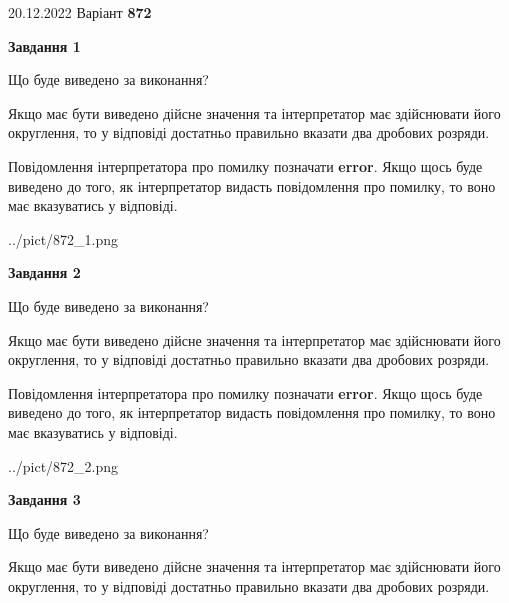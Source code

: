\documentclass[12pt, ukrainian]{article}
\begin{document}
{20.12.2022 Варіант \No \textbf { 872 }\par}
{
\begin {Large}

{\begin {center}\textbf{Завдання 1}\end {center}}\par
Що буде виведено за виконання? \par

Якщо має бути виведено дійсне значення та інтерпретатор має здійснювати його округлення, 
то у відповіді достатньо правильно вказати два дробових розряди.

Повідомлення інтерпретатора про помилку позначати \textbf{error}.
Якщо щось буде виведено до того, як інтерпретатор видасть повідомлення про помилку, 
то воно має вказуватись у відповіді. \par

\begin{center}
	{../pict/872_1.png}
\end{center}
\newpage

{\begin {center}\textbf{Завдання 2}\end {center}}\par
Що буде виведено за виконання? \par

Якщо має бути виведено дійсне значення та інтерпретатор має здійснювати його округлення, 
то у відповіді достатньо правильно вказати два дробових розряди.

Повідомлення інтерпретатора про помилку позначати \textbf{error}.
Якщо щось буде виведено до того, як інтерпретатор видасть повідомлення про помилку, 
то воно має вказуватись у відповіді. \par

\begin{center}
	{../pict/872_2.png}
\end{center}
\newpage

{\begin {center}\textbf{Завдання 3}\end {center}}\par
Що буде виведено за виконання? \par

Якщо має бути виведено дійсне значення та інтерпретатор має здійснювати його округлення, 
то у відповіді достатньо правильно вказати два дробових розряди.


\end{Large}}
\end{document}
